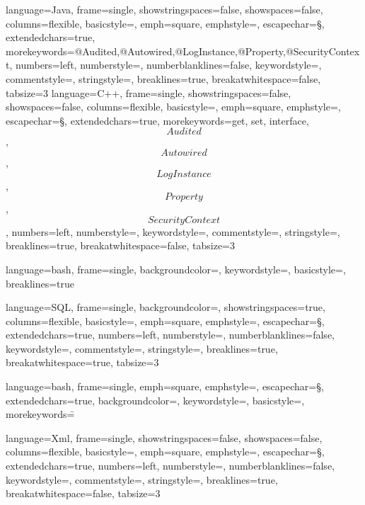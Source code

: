 

{
	language={Java},
	frame={single},
  showstringspaces={false},
	showspaces={false},
  columns={flexible},
  basicstyle={\footnotesize\ttfamily},
	emph={square},
	emphstyle={\color{blue}},
	escapechar={§},
	extendedchars={true},
	morekeywords={@Audited,@Autowired,@LogInstance,@Property,@SecurityContext},
	numbers={left},
  numberstyle={\tiny\color{gray}},
	numberblanklines={false},
  keywordstyle={\color{violet}},
  commentstyle={\color{dkgreen}},
  stringstyle={\color{blue}},
  breaklines={true},
  breakatwhitespace={false},
  tabsize={3}
}
{
	language={C++},
	frame={single},
  showstringspaces={false},
	showspaces={false},
  columns={flexible},
  basicstyle={\footnotesize\ttfamily},
	emph={square},
	emphstyle={\color{blue}},
	escapechar={§},
	extendedchars={true},
	morekeywords={get, set, interface,\[Audited\],\[Autowired\],\[LogInstance\],\[Property\],\[SecurityContext\]},
	numbers={left},
  numberstyle={\tiny\color{gray}},
  keywordstyle={\color{violet}},
  commentstyle={\color{dkgreen}},
  stringstyle={\color{blue}},
  breaklines={true},
  breakatwhitespace={false},
  tabsize={3}
}

{	language=bash,
	frame=single,
	backgroundcolor=\color{lightgrey},
	keywordstyle=\color{blue},
	basicstyle=\ttfamily,
	breaklines={true}
}

{
	language={SQL},
	frame={single},
	backgroundcolor=\color{lightblue},
  showstringspaces={true},
  columns={flexible},
  basicstyle={\small\ttfamily},
	emph={square},
	emphstyle={\color{blue}},
	escapechar={§},
	extendedchars={true},
	numbers={left},
  numberstyle={\tiny\color{gray}},
	numberblanklines={false},
  keywordstyle={\color{violet}},
  commentstyle={\color{dkgreen}},
  stringstyle={\color{blue}},
  breaklines={true},
  breakatwhitespace={true},
  tabsize={3}
}

{	language=bash,
	frame=single,
	emph={square},
	emphstyle={\color{blue}},
	escapechar={§},
	extendedchars={true},
	backgroundcolor=\color{white},
	keywordstyle=\color{blue},
	basicstyle=\ttfamily,
	morekeywords={\=}
}

{
	language={Xml},
	frame={single},
  showstringspaces={false},
	showspaces={false},
  columns={flexible},
  basicstyle={\footnotesize\ttfamily},
	emph={square},
	emphstyle={\color{blue}},
	escapechar={§},
	extendedchars={true},
	numbers={left},
  numberstyle={\tiny\color{gray}},
	numberblanklines={false},
  keywordstyle={\color{violet}},
  commentstyle={\color{dkgreen}},
  stringstyle={\color{blue}},
  breaklines={true},
  breakatwhitespace={false},
  tabsize={3}
}